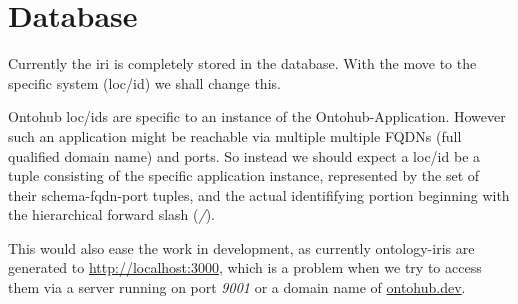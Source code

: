 \documentclass[a4paper,11pt,DIV=25]{scrartcl}
\begin{document}
\section{Database}

Currently the iri is completely stored in the database. With the move to the
specific system (loc/id) we shall change this.

Ontohub loc/ids are specific to an instance of the Ontohub-Application. However
such an application might be reachable via multiple multiple FQDNs (full
qualified domain name) and ports. So instead we should expect a loc/id be a
tuple consisting of the specific application instance, represented by the set
of their schema-fqdn-port tuples, and the actual identififying portion
beginning with the hierarchical forward slash (\textit{/}).

This would also ease the work in development, as currently ontology-iris are
generated to \url{http://localhost:3000}, which is a problem when we try to
access them via a server running on port \textit{9001} or a domain name of
\url{ontohub.dev}.
\end{document}
